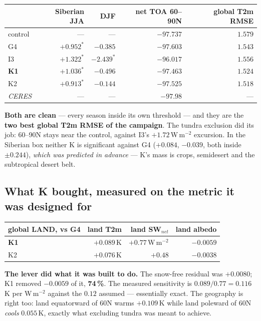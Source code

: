\documentclass[10pt]{article}
\begin{document}
\begin{center}\footnotesize
\begin{tabular}{l r r r r}
\toprule
 & Siberian JJA & DJF & net TOA 60--90N & \textbf{global T2m RMSE} \\
\midrule
control & --- & --- & $-97.737$ & $1.579$ \\
G4 & $+0.952^*$ & $-0.385$ & $-97.603$ & $1.543$ \\
I3 & $+1.322^*$ & $-2.439^*$ & $\mathbf{-96.017}$ & $1.556$ \\
\textbf{K1} & $\mathbf{+1.036^*}$ & $-0.496$ & $-97.463$ & $\mathbf{1.524}$ \\
K2 & $+0.913^*$ & $-0.144$ & $-97.525$ & $\mathbf{1.518}$ \\
\emph{CERES} & --- & --- & $-97.98$ & --- \\
\bottomrule
\end{tabular}
\end{center}

\noindent \textbf{Both are clean} --- every season inside its own threshold --- and they are
the \textbf{two best global T2m RMSE of the campaign}. The tundra exclusion did its job: 60--90N
stays near the control, against I3's $+1.72$\,W\,m$^{-2}$ excursion. In the Siberian box
neither K is significant against G4 ($+0.084$, $-0.039$, both inside $\pm0.244$), \emph{which
was predicted in advance} --- K's mass is crops, semidesert and the subtropical desert belt.

\subsection{What K bought, measured on the metric it was designed for}\label{sub:r17budget}
\begin{center}\footnotesize
\begin{tabular}{l r r r}
\toprule
global LAND, vs G4 & land T2m & land SW$_{net}$ & land albedo \\
\midrule
\textbf{K1} & $\mathbf{+0.089}$\,K & $+0.77$\,W\,m$^{-2}$ & $-0.0059$ \\
K2 & $+0.076$\,K & $+0.48$ & $-0.0038$ \\
\bottomrule
\end{tabular}
\end{center}

\noindent \textbf{The lever did what it was built to do.} The snow-free residual was
$+0.0080$; K1 removed $-0.0059$ of it, \textbf{74\,\%}. The measured sensitivity is
$0.089/0.77 = \mathbf{0.116}$\,K per W\,m$^{-2}$ against the $0.12$ assumed --- essentially
exact. The geography is right too: land equatorward of 60N warms $+0.109$\,K while land
poleward of 60N \emph{cools} $0.055$\,K, exactly what excluding tundra was meant to achieve.
\end{document}
